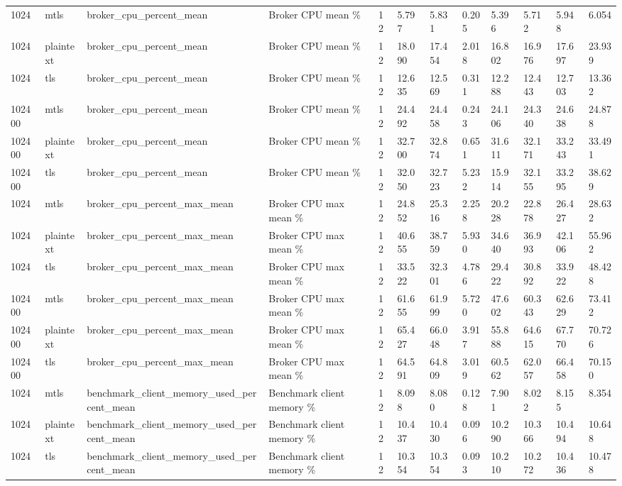 \begin{longtable}{llllllllllll}
1024 & mtls & broker\_cpu\_percent\_mean & Broker CPU mean \% & 12 & 5.797 & 5.831 & 0.205 & 5.396 & 5.712 & 5.948 & 6.054 \\
1024 & plaintext & broker\_cpu\_percent\_mean & Broker CPU mean \% & 12 & 18.090 & 17.454 & 2.018 & 16.802 & 16.976 & 17.697 & 23.939 \\
1024 & tls & broker\_cpu\_percent\_mean & Broker CPU mean \% & 12 & 12.635 & 12.569 & 0.311 & 12.288 & 12.443 & 12.703 & 13.362 \\
102400 & mtls & broker\_cpu\_percent\_mean & Broker CPU mean \% & 12 & 24.492 & 24.458 & 0.243 & 24.106 & 24.340 & 24.638 & 24.878 \\
102400 & plaintext & broker\_cpu\_percent\_mean & Broker CPU mean \% & 12 & 32.700 & 32.874 & 0.651 & 31.611 & 32.171 & 33.243 & 33.491 \\
102400 & tls & broker\_cpu\_percent\_mean & Broker CPU mean \% & 12 & 32.050 & 32.723 & 5.232 & 15.914 & 32.155 & 33.295 & 38.629 \\
1024 & mtls & broker\_cpu\_percent\_max\_mean & Broker CPU max mean \% & 12 & 24.852 & 25.316 & 2.258 & 20.228 & 22.878 & 26.427 & 28.632 \\
1024 & plaintext & broker\_cpu\_percent\_max\_mean & Broker CPU max mean \% & 12 & 40.655 & 38.759 & 5.930 & 34.640 & 36.993 & 42.106 & 55.962 \\
1024 & tls & broker\_cpu\_percent\_max\_mean & Broker CPU max mean \% & 12 & 33.522 & 32.301 & 4.786 & 29.422 & 30.892 & 33.922 & 48.428 \\
102400 & mtls & broker\_cpu\_percent\_max\_mean & Broker CPU max mean \% & 12 & 61.655 & 61.999 & 5.720 & 47.602 & 60.343 & 62.629 & 73.412 \\
102400 & plaintext & broker\_cpu\_percent\_max\_mean & Broker CPU max mean \% & 12 & 65.427 & 66.048 & 3.917 & 55.888 & 64.615 & 67.770 & 70.726 \\
102400 & tls & broker\_cpu\_percent\_max\_mean & Broker CPU max mean \% & 12 & 64.591 & 64.809 & 3.019 & 60.562 & 62.057 & 66.458 & 70.150 \\
1024 & mtls & benchmark\_client\_memory\_used\_percent\_mean & Benchmark client memory \% & 12 & 8.098 & 8.080 & 0.128 & 7.901 & 8.022 & 8.155 & 8.354 \\
1024 & plaintext & benchmark\_client\_memory\_used\_percent\_mean & Benchmark client memory \% & 12 & 10.437 & 10.430 & 0.096 & 10.290 & 10.366 & 10.494 & 10.648 \\
1024 & tls & benchmark\_client\_memory\_used\_percent\_mean & Benchmark client memory \% & 12 & 10.354 & 10.354 & 0.093 & 10.210 & 10.272 & 10.436 & 10.478 \\

\end{longtable}
